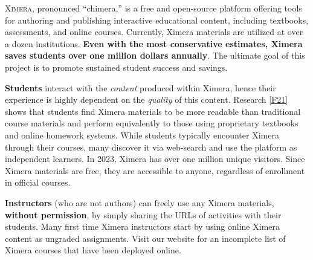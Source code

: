 \documentclass[twocolumn]{article}
\begin{document}
\pagestyle{main}
\thispagestyle{title}
\noindent
\lettrine[lines=2]{X}{imera}, pronounced ``chimera,'' is a free and
open-source platform offering tools for authoring and publishing
interactive educational content, including textbooks, assessments, and
online
courses. Currently, Ximera materials are utilized at over a dozen
institutions. \textbf{Even with the most conservative estimates, Ximera saves
    students
    over one million dollars annually}. The ultimate goal of this project is to
promote sustained student success and savings.

\vspace{.2cm}

\begin{xframe}
    {\sffamily\bfseries Students} interact with the \textit{content} produced within
    Ximera, hence their experience is highly dependent on the \textit{quality} of this
    content. Research \ref{F21} shows that students find Ximera materials to be more readable
    than traditional course materials and perform equivalently to those using
    proprietary textbooks and online homework systems. While students typically
    encounter Ximera through their courses, many discover it via web-search and
    use the platform as independent learners. In 2023, Ximera has over one million
    unique visitors. Since Ximera materials are free, they are accessible to
    anyone, regardless of enrollment in official courses.
\end{xframe}
\begin{xframe}
    {\sffamily\bfseries Instructors} (who are not authors) can freely use
    any Ximera materials,
    \textbf{without permission}, by simply sharing the URLs of activities
    with their students. Many first time Ximera instructors start  by
    using online Ximera content as
    ungraded assignments. Visit our website for an incomplete list of
    Ximera courses that have been deployed online.
\end{xframe}
\end{document}
